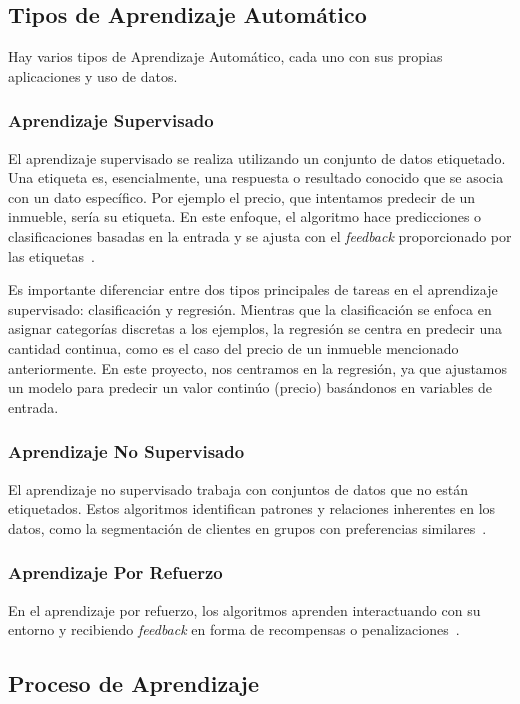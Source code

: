 \subsection{Tipos de Aprendizaje Automático}

Hay varios tipos de Aprendizaje Automático, cada uno con sus propias aplicaciones y uso de datos.

\subsubsection{Aprendizaje Supervisado}
El aprendizaje supervisado se realiza utilizando un conjunto de datos etiquetado. Una etiqueta es, esencialmente, una respuesta o resultado conocido que se asocia con un dato específico. Por ejemplo el precio, que intentamos predecir de un inmueble, sería su etiqueta. En este enfoque, el algoritmo hace predicciones o clasificaciones basadas en la entrada y se ajusta con el \textit{feedback} proporcionado por las etiquetas~\cite{mahesh2020}. 

Es importante diferenciar entre dos tipos principales de tareas en el aprendizaje supervisado: clasificación y regresión. Mientras que la clasificación se enfoca en asignar categorías discretas a los ejemplos, la regresión se centra en predecir una cantidad continua, como es el caso del precio de un inmueble mencionado anteriormente. En este proyecto, nos centramos en la regresión, ya que ajustamos un modelo para predecir un valor continúo (precio) basándonos en variables de entrada.

\subsubsection{Aprendizaje No Supervisado}
El aprendizaje no supervisado trabaja con conjuntos de datos que no están etiquetados. Estos algoritmos identifican patrones y relaciones inherentes en los datos, como la segmentación de clientes en grupos con preferencias similares~\cite{mahesh2020}. 

\subsubsection{Aprendizaje Por Refuerzo}
En el aprendizaje por refuerzo, los algoritmos aprenden interactuando con su entorno y recibiendo \textit{feedback} en forma de recompensas o penalizaciones~\cite{mahesh2020}. 

\subsection{Proceso de Aprendizaje}

